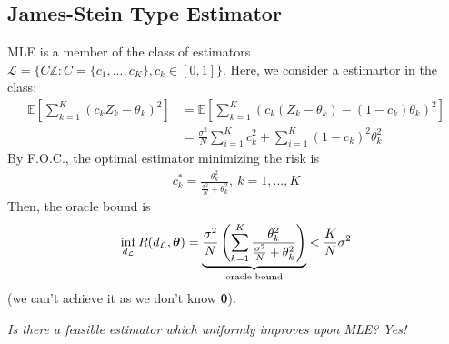 \documentclass[11pt]{elegantbook}
\begin{document}
\subsection{James-Stein Type Estimator}
MLE is a member of the class of estimators $\mathcal{L}=\{C \mathbb{Z}:C=\{c_1,...,c_K\},c_k\in[0,1]\}$. Here, we consider a estimartor in the class:
\begin{equation}
    \begin{aligned}
        \mathbb{E}\left[\sum_{k=1}^K\left(c_kZ_k-\theta_k\right)^2\right]&=\mathbb{E}\left[\sum_{k=1}^K\left(c_k(Z_k-\theta_k)-(1-c_k)\theta_k\right)^2\right]\\
        &=\frac{\sigma^2}{N}\sum_{i=1}^K c_k^2+\sum_{i=1}^K(1-c_k)^2\theta_k^2
    \end{aligned}
    \nonumber
\end{equation}
By F.O.C., the optimal estimator minimizing the risk is
\begin{equation}
    \begin{aligned}
        c^*_k=\frac{\theta_k^2}{\frac{\sigma^2}{N}+\theta_k^2},\ k=1,...,K
    \end{aligned}
    \nonumber
\end{equation}
Then, the oracle bound is
\begin{equation}
    \begin{aligned}
        \inf_{d_\mathcal{L}}R(d_\mathcal{L},\boldsymbol{\theta})=\underbrace{\frac{\sigma^2}{N}\left(\sum_{k=1}^K\frac{\theta_k^2}{\frac{\sigma^2}{N}+\theta_k^2}\right)}_{\textnormal{oracle bound}}<\frac{K}{N}\sigma^2
    \end{aligned}
    \nonumber
\end{equation}
(we can't achieve it as we don't know $\boldsymbol{\theta}$).

\textit{Is there a feasible estimator which uniformly improves upon MLE? Yes!}
\end{document}
